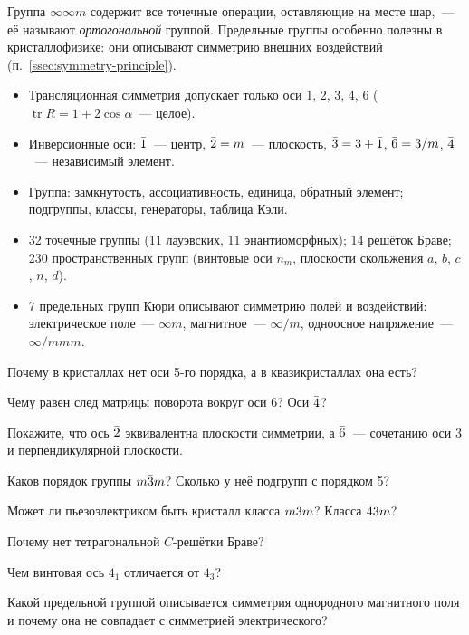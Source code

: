 Группа $\infty\infty m$ содержит все точечные операции, оставляющие на месте
шар,~— её называют \emph{ортогональной} группой. Предельные группы особенно
полезны в кристаллофизике: они описывают симметрию внешних воздействий
(п.~\ref{ssec:symmetry-principle}).

\begin{itogi}
\begin{itemize}
\item Трансляционная симметрия допускает только оси 1, 2, 3, 4, 6
($\operatorname{tr}R=1+2\cos\alpha$~— целое).
\item Инверсионные оси: $\bar{1}$~— центр, $\bar{2}=m$~— плоскость, $\bar{3}=3+\bar{1}$,
$\bar{6}=3/m$, $\bar{4}$~— независимый элемент.
\item Группа: замкнутость, ассоциативность, единица, обратный элемент;
подгруппы, классы, генераторы, таблица Кэли.
\item 32 точечные группы (11 лауэвских, 11 энантиоморфных); 14 решёток
Браве; 230 пространственных групп (винтовые оси $n_m$, плоскости
скольжения $a$, $b$, $c$, $n$, $d$).
\item 7 предельных групп Кюри описывают симметрию полей и воздействий:
электрическое поле~— $\infty m$, магнитное~— $\infty/m$, одноосное напряжение~—
$\infty/mmm$.
\end{itemize}
\end{itogi}

\begin{proverka}
\item Почему в кристаллах нет оси 5-го порядка, а в квазикристаллах она
есть?
\item Чему равен след матрицы поворота вокруг оси 6? Оси $\bar{4}$?
\item Покажите, что ось $\bar{2}$ эквивалентна плоскости симметрии, а $\bar{6}$~—
сочетанию оси 3 и перпендикулярной плоскости.
\item Каков порядок группы $m\bar{3}m$? Сколько у неё подгрупп с порядком 5?
\item Может ли пьезоэлектриком быть кристалл класса $m\bar{3}m$? Класса $\bar{4}3m$?
\item Почему нет тетрагональной $C$-решётки Браве?
\item Чем винтовая ось $4_1$ отличается от $4_3$?
\item Какой предельной группой описывается симметрия однородного
магнитного поля и почему она не совпадает с симметрией электрического?
\end{proverka}
